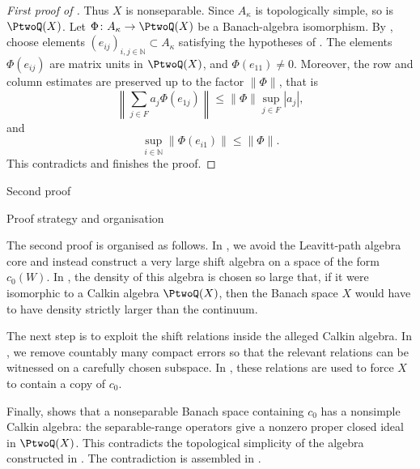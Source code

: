 \documentclass[11pt,reqno]{amsart}
\makeatletter
\theoremstyle{plain}
\theoremstyle{definition}
\newcommand{\N}{\mathbb N}
\newcounter{problempaper}
\newenvironment{problempaperbody}{%
  \setcounter{subsection}{0}%
  \setcounter{subsubsection}{0}%
  \setcounter{paragraph}{0}%
  \renewcommand{\thesubsection}{\arabic{subsection}}%
  \renewcommand{\thesubsubsection}{\thesubsection.\arabic{subsubsection}}%
  \renewcommand{\theparagraph}{\thesubsubsection.\arabic{paragraph}}%
  \let\problem@outersection\section
  \let\problem@outersubsection\subsection
  \let\problem@outersubsubsection\subsubsection
  \let\problem@outerparagraph\paragraph
  \let\section\problem@papersection
  \let\subsection\problem@papersubsection
  \let\subsubsection\problem@papersubsubsection
}{%
  \let\section\problem@outersection
  \let\subsection\problem@outersubsection
  \let\subsubsection\problem@outersubsubsection
  \let\paragraph\problem@outerparagraph
}
\newcommand{\problem@target}[2]{%
  \hypertarget{problem-\theproblempaper-#1-#2}{}%
}
\newcommand{\problem@paperheading}[3]{%
  \par\bigskip
  \problem@target{#1}{#2}%
  \noindent{\large\bfseries #2.\quad #3\par}%
  \nobreak\smallskip
}
\newcommand{\problem@papersubheading}[3]{%
  \par\medskip
  \problem@target{#1}{#2}%
  \noindent{\normalsize\bfseries #2.\quad #3\par}%
  \nobreak\smallskip
}
\newcommand{\problem@papersubsubheading}[3]{%
  \par\smallskip
  \problem@target{#1}{#2}%
  \noindent{\normalsize\itshape #2.\quad #3.\ }%
}
\def\problem@papersection{%
  \@ifstar{\problem@papersectionstar}{\problem@papersectionnostar}%
}
\def\problem@papersectionstar#1{%
  \par\bigskip\noindent{\large\bfseries #1\par}\nobreak\smallskip
}
\def\problem@papersectionnostar#1{%
  \refstepcounter{subsection}%
  \setcounter{subsubsection}{0}%
  \setcounter{paragraph}{0}%
  \problem@paperheading{section}{\thesubsection}{#1}%
  \problem@writecontentsline{section}{\thesubsection}{#1}%
}
\def\problem@papersubsection{%
  \@ifstar{\problem@papersubsectionstar}{\problem@papersubsectionnostar}%
}
\def\problem@papersubsectionstar#1{%
  \par\medskip\noindent{\normalsize\bfseries #1\par}\nobreak\smallskip
}
\def\problem@papersubsectionnostar#1{%
  \refstepcounter{subsubsection}%
  \setcounter{paragraph}{0}%
  \problem@papersubheading{subsection}{\thesubsubsection}{#1}%
  \problem@writecontentsline{subsection}{\thesubsubsection}{#1}%
}
\def\problem@papersubsubsection{%
  \@ifstar{\problem@papersubsubsectionstar}{\problem@papersubsubsectionnostar}%
}
\def\problem@papersubsubsectionstar#1{%
  \par\smallskip\noindent{\normalsize\itshape #1.\ }%
}
\def\problem@papersubsubsectionnostar#1{%
  \refstepcounter{paragraph}%
  \problem@papersubsubheading{subsubsection}{\theparagraph}{#1}%
  \problem@writecontentsline{subsubsection}{\theparagraph}{#1}%
}
\newcommand{\problem@writecontentsline}[3]{%
  \begingroup
  \protected@write\@auxout{}{%
    \string\problemcontentsentry{\theproblempaper}{#1}{#2}{#3}{\thepage}%
  }%
  \endgroup
}
\newcommand{\problemcontentsentry}[5]{%
  \@ifundefined{problemcontents@#1}{%
    \expandafter\gdef\csname problemcontents@#1\endcsname{}%
  }{}%
  \expandafter\g@addto@macro\csname problemcontents@#1\endcsname{%
    \problemcontentsline{#1}{#2}{#3}{#4}{#5}%
  }%
}
\newcommand{\problemcontentslink}[4]{%
  \hyperlink{problem-#1-#2-#3}{#4}%
}
\newcommand{\problemcontentsline}[5]{%
  \ifstrequal{#2}{section}{%
    \par\noindent
    \problemcontentslink{#1}{#2}{#3}{\makebox[2.5em][l]{#3}#4}%
    \nobreak\dotfill
    \problemcontentslink{#1}{#2}{#3}{#5}\par
  }{%
    \ifstrequal{#2}{subsection}{%
      \par\noindent\hspace*{1.5em}%
      \problemcontentslink{#1}{#2}{#3}{\makebox[3.5em][l]{#3}#4}%
      \nobreak\dotfill
      \problemcontentslink{#1}{#2}{#3}{#5}\par
    }{%
      \par\noindent\hspace*{3em}%
      \problemcontentslink{#1}{#2}{#3}{\makebox[4.5em][l]{#3}#4}%
      \nobreak\dotfill
      \problemcontentslink{#1}{#2}{#3}{#5}\par
    }%
  }%
}
\makeatother
\begin{document}
\begin{problempaperbody}
\begin{proof}[First proof of ]
Thus $X$ is nonseparable. Since $A_\kappa$ is topologically simple, so is $\PtwoQ(X)$. Let $\Phi\colon A_\kappa\to\PtwoQ(X)$ be a Banach-algebra isomorphism. By , choose elements $(e_{ij})_{i,j\in\N}\subset A_\kappa$ satisfying the hypotheses of . The elements $\Phi(e_{ij})$ are matrix units in $\PtwoQ(X)$, and $\Phi(e_{11})\ne0$. Moreover, the row and column estimates are preserved up to the factor $\|\Phi\|$, that is
\begin{equation*}
        \left\|\sum_{j\in F}a_j\Phi(e_{1j})\right\|\leq \|\Phi\|\sup_{j\in F}|a_j|,
\end{equation*}
and
\begin{equation*}
        \sup_{i \in \N} \|\Phi(e_{i1})\|\leq\|\Phi\|.
\end{equation*}
This contradicts  and finishes the proof.
\end{proof}


\section{Second proof}

\subsection{Proof strategy and organisation}

The second proof is organised as follows. In , we avoid the Leavitt-path algebra core and instead construct a very large shift algebra on a space of the form $c_0(W)$. In , the density of this algebra is chosen so large that, if it were isomorphic to a Calkin algebra $\PtwoQ(X)$, then the Banach space $X$ would have to have density strictly larger than the continuum.

The next step is to exploit the shift relations inside the alleged Calkin algebra. In , we remove countably many compact errors so that the relevant relations can be witnessed on a carefully chosen subspace. In , these relations are used to force $X$ to contain a copy of $c_0$.

Finally,  shows that a nonseparable Banach space containing $c_0$ has a nonsimple Calkin algebra: the separable-range operators give a nonzero proper closed ideal in $\PtwoQ(X)$. This contradicts the topological simplicity of the algebra constructed in . The contradiction is assembled in .


\end{problempaperbody}
\end{document}
